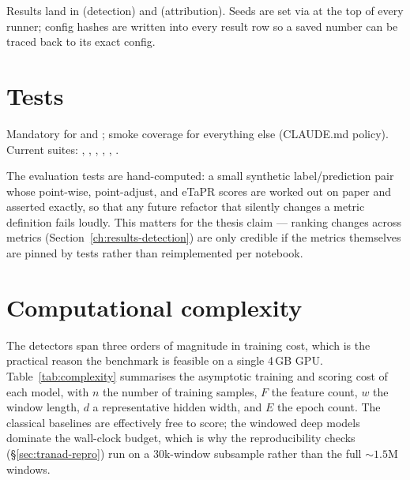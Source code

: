 Results land in  (detection) and  (attribution).  Seeds are set via  at the top of every runner; config hashes are written into every result row so a saved number can be traced back to its exact config.

\section{Tests}

Mandatory for  and ; smoke coverage for everything else (CLAUDE.md policy).  Current suites: , , , , , .

The evaluation tests are hand-computed: a small synthetic label/prediction pair whose point-wise, point-adjust, and eTaPR scores are worked out on paper and asserted exactly, so that any future refactor that silently changes a metric definition fails loudly.  This matters for the thesis claim --- ranking changes across metrics (Section~\ref{ch:results-detection}) are only credible if the metrics themselves are pinned by tests rather than reimplemented per notebook.

\section{Computational complexity}
\label{sec:complexity}

The detectors span three orders of magnitude in training cost, which is the practical reason the benchmark is feasible on a single 4\,GB GPU.  Table~\ref{tab:complexity} summarises the asymptotic training and scoring cost of each model, with $n$ the number of training samples, $F$ the feature count, $w$ the window length, $d$ a representative hidden width, and $E$ the epoch count.  The classical baselines are effectively free to score; the windowed deep models dominate the wall-clock budget, which is why the reproducibility checks (\S\ref{sec:tranad-repro}) run on a $30\mathrm{k}$-window subsample rather than the full $\sim 1.5\mathrm{M}$ windows.


